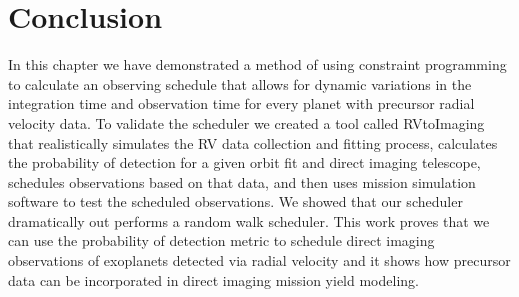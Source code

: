 \section{Conclusion}

In this chapter we have demonstrated a method of using constraint programming
to calculate an observing schedule that allows for dynamic variations in the
integration time and observation time for every planet with precursor radial
velocity data. To validate the scheduler we created a tool called RVtoImaging
that realistically simulates the RV data collection and fitting process,
calculates the probability of detection for a given orbit fit and direct
imaging telescope, schedules observations based on that data, and then uses
mission simulation software to test the scheduled observations. We showed that
our scheduler dramatically out performs a random walk scheduler. This work
proves that we can use the probability of detection metric to schedule direct
imaging observations of exoplanets detected via radial velocity and it shows
how precursor data can be incorporated in direct imaging mission yield
modeling.
